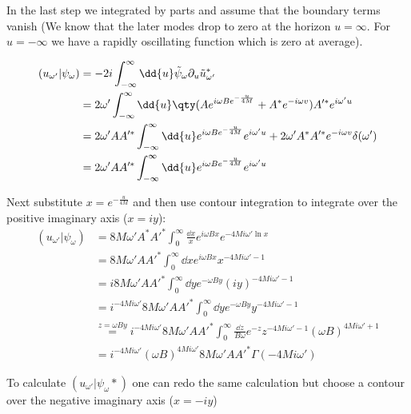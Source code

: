 In the last step we integrated by parts and assume that the boundary terms vanish (We know that the later modes drop to zero at the horizon \(u = \infty\). For \(u = -\infty\) we have a rapidly oscillating function which is zero at average).

\begin{align}
(u_{\omega'}|\psi_\omega) &= -2i\int_{-\infty}^\infty \dd{u} \tilde{\psi}_\omega \partial_u \tilde{u}_{\omega'}^*\\
	&= 2\omega' \int_{-\infty}^\infty \dd{u} \qty(A e^{i\omega B e^{-\frac{u}{4M}}} + A^* e^{-i\omega v}) A'^* e^{i\omega' u}\\
	&= 2\omega' AA'^* \int_{-\infty}^\infty \dd{u} e^{i\omega B e^{-\frac{u}{4M}}} e^{i\omega' u} + 2\omega' A^*A'^* e^{-i\omega v} \delta(\omega')\\
	&= 2\omega' AA'^* \int_{-\infty}^\infty \dd{u} e^{i\omega B e^{-\frac{u}{4M}}} e^{i\omega' u}
\end{align}

Next substitute \(x = e^{-\frac{u}{4M}}\) and then use contour integration to integrate over the positive imaginary axis (\(x = i y\)):
\begin{align}
(u_{\omega'}|\psi_\omega) &= 8M \omega' A^*A'^* \int_{0}^\infty \frac{\dd{x}}{x} e^{i\omega B x} e^{-4M i \omega' \ln x}\\
&= 8M \omega' AA'^* \int_{0}^\infty \dd{x} e^{i\omega B x} x^{-4M i \omega' - 1}\\
&= i 8M \omega' AA'^* \int_{0}^\infty \dd{y} e^{-\omega B y} (iy)^{-4M i \omega' - 1}\\
&= i^{-4M i \omega'} 8M \omega' AA'^* \int_{0}^\infty \dd{y} e^{-\omega B y} y^{-4M i \omega' - 1}\\
&\overset{z = \omega B y}{=} i^{-4M i \omega'} 8M \omega' AA'^* \int_{0}^\infty \frac{\dd{z}}{B\omega} e^{-z} z^{-4M i \omega' - 1} (\omega B)^{4M i \omega' + 1}\\
&= i^{-4M i \omega'} (\omega B)^{4M i \omega'} 8M \omega' AA'^* \Gamma(-4M i \omega')
\label{equ:app_scalarproduct}
\end{align}

To calculate \((u_{\omega'}|\psi_\omega*)\) one can redo the same calculation but choose a contour over the negative imaginary axis (\(x = - iy\))

